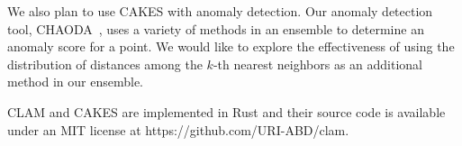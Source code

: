 We also plan to use CAKES with anomaly detection.
Our anomaly detection tool, CHAODA~\cite{ishaq2021clustered}, uses a variety of methods in an ensemble to determine an anomaly score for a point.
We would like to explore the effectiveness of using the distribution of distances among the $k$-th nearest neighbors as an additional method in our ensemble.

CLAM and CAKES are implemented in Rust and their source code is available under an MIT license at https://github.com/URI-ABD/clam.

